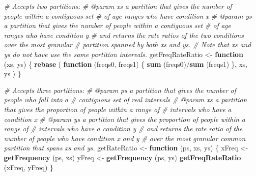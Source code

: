 \documentclass[]{article}
\newenvironment{Shaded}{}{}
\newcommand{\CommentTok}[1]{\textcolor[rgb]{0.38,0.63,0.69}{\textit{#1}}}
\newcommand{\ControlFlowTok}[1]{\textcolor[rgb]{0.00,0.44,0.13}{\textbf{#1}}}
\newcommand{\KeywordTok}[1]{\textcolor[rgb]{0.00,0.44,0.13}{\textbf{#1}}}
\newcommand{\NormalTok}[1]{#1}
\newcommand{\OperatorTok}[1]{\textcolor[rgb]{0.40,0.40,0.40}{#1}}
\newcommand{\StringTok}[1]{\textcolor[rgb]{0.25,0.44,0.63}{#1}}
\begin{document}
\begin{Shaded}
\begin{Highlighting}[]
\CommentTok{# Accepts two partitions:}
\CommentTok{# @param xs a partition that gives the number of people within a contiguous set}
\CommentTok{#   of age ranges who have condition x}
\CommentTok{# @param ys a partition that gives the number of people within a contiguous set}
\CommentTok{#   of age ranges who have condition y}
\CommentTok{# and returns the rate ratios of the two conditions over the most granular}
\CommentTok{# partition spanned by both xs and ys.}
\CommentTok{# Note that xs and ys do not have use the same partition intervals.}
\NormalTok{getFreqRateRatio <-}\StringTok{ }\ControlFlowTok{function}\NormalTok{ (xs, ys) \{}
  \KeywordTok{rebase}\NormalTok{ (}
    \ControlFlowTok{function}\NormalTok{ (freqs0, freqs1) \{}
      \KeywordTok{sum}\NormalTok{ (freqs0)}\OperatorTok{/}\KeywordTok{sum}\NormalTok{ (freqs1)}
\NormalTok{    \}, xs, ys}
\NormalTok{  )}
\NormalTok{\}}

\CommentTok{# Accepts three partitions:}
\CommentTok{# @param ps a partition that gives the number of people who fall into a}
\CommentTok{#   contiguous set of real intervals}
\CommentTok{# @param xs a partition that gives the proportion of people within a range of}
\CommentTok{#   intervals who have a condition x}
\CommentTok{# @param ys a partition that gives the proportion of people within a range of}
\CommentTok{#   intervals who have a condition y}
\CommentTok{# and returns the rate ratio of the number of people who have condition x and y}
\CommentTok{# over the most granular common partition that spans xs and ys.}
\NormalTok{getRateRatio <-}\StringTok{ }\ControlFlowTok{function}\NormalTok{ (ps, xs, ys) \{}
\NormalTok{  xFreq <-}\StringTok{ }\KeywordTok{getFrequency}\NormalTok{ (ps, xs)}
\NormalTok{  yFreq <-}\StringTok{ }\KeywordTok{getFrequency}\NormalTok{ (ps, ys)}
  \KeywordTok{getFreqRateRatio}\NormalTok{ (xFreq, yFreq)}
\NormalTok{\}}


\end{Highlighting}
\end{Shaded}
\end{document}
